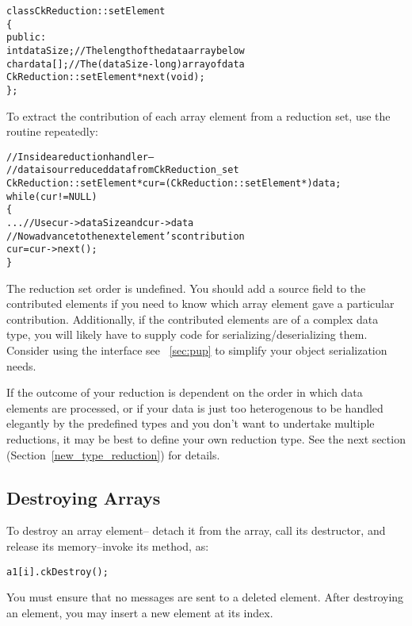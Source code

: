 \begin{alltt}
class CkReduction::setElement 
\{
public:
  int dataSize;//The length of the data array below
  char data[];//The (dataSize-long) array of data
  CkReduction::setElement *next(void);
\};
\end{alltt}

To extract the contribution of each array element from a reduction set, use the
 routine repeatedly:

\begin{alltt}
  //Inside a reduction handler-- 
  //  data is our reduced data from CkReduction_set
  CkReduction::setElement *cur=(CkReduction::setElement *)data;
  while (cur!=NULL)
  \{
    ... //Use cur->dataSize and cur->data
    //Now advance to the next element's contribution
    cur=cur->next();
  \}
\end{alltt}

The reduction set order is undefined.  You should add a source field to the
contributed elements if you need to know which array element gave a particular
contribution.  Additionally, if the contributed elements are of a complex 
data type, you will likely have to supply code for 
serializing/deserializing them.
Consider using the 
interface see ~\ref{sec:pup} to simplify your object serialization
needs.

If the outcome of your reduction is dependent on the order in which 
data elements are processed, or if your data is just too
heterogenous to be handled elegantly by the predefined types and you
don't want to undertake multiple reductions, it may be best to define
your own reduction type.  See the next section
(Section~\ref{new_type_reduction}) for details.

\subsection{Destroying Arrays}

To destroy an array element-- detach it from the array,
call its destructor, and release its memory--invoke its 
 method, as:

\begin{alltt}
a1[i].ckDestroy();
\end{alltt}

You must ensure that no messages are sent to a deleted element. 
After destroying an element, you may insert a new element at
its index.
